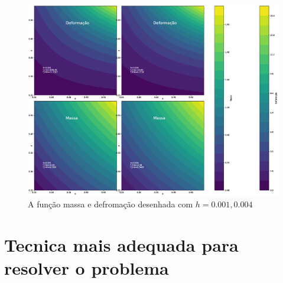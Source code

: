 \documentclass[a4paper,12pt]{article}
\begin{document}
\begin{figure}[h]
\begin{center}
\includegraphics[scale=0.2]{deformacaoEmassa.eps}
\end{center}
\caption{A função massa e defromação desenhada com $h= 0.001, 0.004$}
\label{fig:defIm1}
\end{figure}

\section{Tecnica mais adequada para resolver o problema}




%
\end{document}
